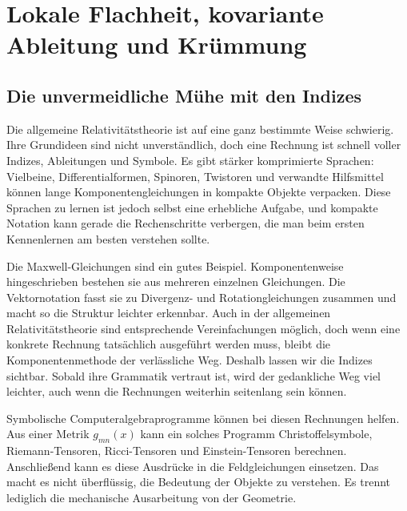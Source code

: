 \chapter{Lokale Flachheit, kovariante Ableitung und Krümmung}


\section{Die unvermeidliche Mühe mit den Indizes}

Die allgemeine Relativitätstheorie ist auf eine ganz bestimmte Weise schwierig. Ihre Grundideen sind nicht unverständlich, doch eine Rechnung ist schnell voller Indizes, Ableitungen und Symbole. Es gibt stärker komprimierte Sprachen: Vielbeine, Differentialformen, Spinoren, Twistoren und verwandte Hilfsmittel können lange Komponentengleichungen in kompakte Objekte verpacken. Diese Sprachen zu lernen ist jedoch selbst eine erhebliche Aufgabe, und kompakte Notation kann gerade die Rechenschritte verbergen, die man beim ersten Kennenlernen am besten verstehen sollte.

Die Maxwell-Gleichungen sind ein gutes Beispiel. Komponentenweise hingeschrieben bestehen sie aus mehreren einzelnen Gleichungen. Die Vektornotation fasst sie zu Divergenz- und Rotationgleichungen zusammen und macht so die Struktur leichter erkennbar. Auch in der allgemeinen Relativitätstheorie sind entsprechende Vereinfachungen möglich, doch wenn eine konkrete Rechnung tatsächlich ausgeführt werden muss, bleibt die Komponentenmethode der verlässliche Weg. Deshalb lassen wir die Indizes sichtbar. Sobald ihre Grammatik vertraut ist, wird der gedankliche Weg viel leichter, auch wenn die Rechnungen weiterhin seitenlang sein können.

Symbolische Computeralgebraprogramme können bei diesen Rechnungen helfen. Aus einer Metrik \(g_{mn}(x)\) kann ein solches Programm Christoffelsymbole, Riemann-Tensoren, Ricci-Tensoren und Einstein-Tensoren berechnen. Anschließend kann es diese Ausdrücke in die Feldgleichungen einsetzen. Das macht es nicht überflüssig, die Bedeutung der Objekte zu verstehen. Es trennt lediglich die mechanische Ausarbeitung von der Geometrie.

